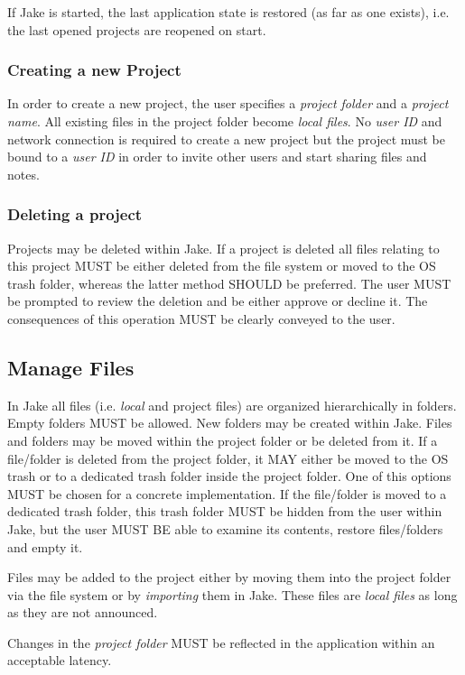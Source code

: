 If Jake is started, the last application state is restored (as far as one exists), i.e. the last opened projects are reopened on start.

\subsubsection{Creating a new Project}
In order to create a new project, the user specifies a \emph{project folder} and a \emph{project name}. All existing files in the project folder become \emph{local files}. No \emph{user ID} and network connection is required to create a new project but the project must be bound to a \emph{user ID} in order to invite other users and start sharing files and notes.

\subsubsection{Deleting a project}
Projects may be deleted within Jake. If a project is deleted all files relating to this project MUST be either deleted from the file system or moved to the OS trash folder, whereas the latter method SHOULD be preferred. The user MUST be prompted to review the deletion and be either approve or decline it. The consequences of this operation MUST be clearly conveyed to the user.

\subsection{Manage Files}
In Jake all files (i.e. \emph{local} and {project files}) are organized hierarchically in folders. Empty folders MUST be allowed. New folders may be created within Jake. Files and folders may be moved within the project folder or be deleted from it. If a file/folder is deleted from the project folder, it MAY either be moved to the OS trash or to a dedicated trash folder inside the project folder. One of this options MUST be chosen for a concrete implementation. If the file/folder is moved to a dedicated trash folder, this trash folder MUST be hidden from the user within Jake, but the user MUST BE able to examine its contents, restore files/folders and empty it. 

Files may be added to the project either by moving them into the project folder via the file system or by \emph{importing} them in Jake. These files are \emph{local files} as long as they are not announced. 

Changes in the \emph{project folder} MUST be reflected in the application within an acceptable latency.

